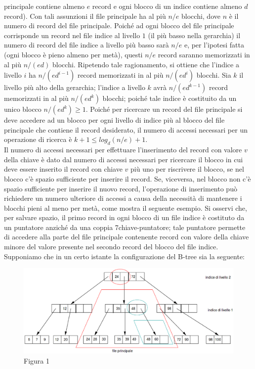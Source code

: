 principale contiene almeno $e$ record e ogni blocco di un indice contiene almeno $d$ record). Con tali
assunzioni il file principale ha al più $n/e$ blocchi, dove $n$ è il numero di record del file principale.
Poiché ad ogni blocco del file principale corrisponde un record nel file indice al livello $1$ (il più
basso nella gerarchia) il numero di record del file indice a livello più basso sarà $n/e$ e, per l’ipotesi
fatta (ogni blocco è pieno almeno per metà), questi $n/e$ record saranno memorizzati in al più $n/(ed)$
blocchi. Ripetendo tale ragionamento, si ottiene che l’indice a livello $i$ ha $n/(ed^{i-1})$ record
memorizzati in al più $n/(ed^i)$ blocchi. Sia $k$ il livello più alto della gerarchia; l’indice a livello
$k$ avrà $n/(ed^{k- 1})$ record memorizzati in al più $n/(ed^k)$ blocchi; poiché tale indice è costituito 
da un unico blocco $n/(ed^k)\geq 1$. Poiché per ricercare un record del file principale si deve accedere 
ad un blocco per ogni livello di indice più al blocco del file principale che contiene il record 
desiderato, il numero di accessi necessari per un operazione di ricerca è $k +1 \leq log_d(n/e)+1$.\\
Il numero di accessi necessari per effettuare l’inserimento del record con valore $v$ della chiave è
dato dal numero di accessi necessari per ricercare il blocco in cui deve essere inserito il record con
chiave $v$ più uno per riscrivere il blocco, se nel blocco c’è spazio sufficiente per inserire il record.
Se, viceversa, nel blocco non c’è spazio sufficiente per inserire il nuovo record, l’operazione di
inserimento può richiedere un numero ulteriore di accessi a causa della necessità di mantenere i
blocchi pieni al meno per metà, come mostra il seguente esempio. Si osservi che, per salvare spazio,
il primo record in ogni blocco di un file indice è costituto da un puntatore anziché da una coppia
7chiave-puntatore; tale puntatore permette di accedere alla parte del file principale contenente record
con valore della chiave minore del valore presente nel secondo record del blocco del file indice.
Supponiamo che in un certo istante la configurazione del B-tree sia la seguente:
\begin{figure}[h!]
  \centering
  \includegraphics[width=430px]{img_5_3_4(1).eps}
  Figura 1
\end{figure}

